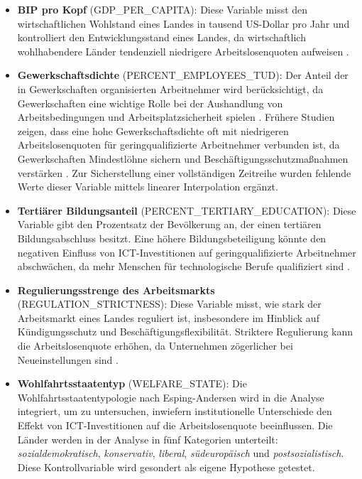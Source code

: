 \begin{itemize}
    \item \textbf{\ac{BIP} pro Kopf} (GDP\_PER\_CAPITA): Diese Variable misst den wirtschaftlichen 
    Wohlstand eines Landes in tausend US-Dollar pro Jahr und kontrolliert den Entwicklungsstand 
    eines Landes, da wirtschaftlich wohlhabendere Länder tendenziell niedrigere Arbeitslosenquoten 
    aufweisen \parencite{oecd2022gdp}.

    \item \textbf{Gewerkschaftsdichte} (PERCENT\_EMPLOYEES\_TUD): Der Anteil der in Gewerkschaften 
    organisierten Arbeitnehmer wird berücksichtigt, da Gewerkschaften eine wichtige Rolle bei der 
    Aushandlung von Arbeitsbedingungen und Arbeitsplatzsicherheit spielen \parencite{oecd2022tud}. 
    Frühere Studien zeigen, dass eine hohe Gewerkschaftsdichte oft mit niedrigeren 
    Arbeitslosenquoten für geringqualifizierte Arbeitnehmer verbunden ist, da Gewerkschaften 
    Mindestlöhne sichern und Beschäftigungsschutzmaßnahmen verstärken 
    \parencite[S. 61]{nickell1997unemployment}. Zur Sicherstellung einer vollständigen Zeitreihe 
    wurden fehlende Werte dieser Variable mittels linearer Interpolation ergänzt.

    \item \textbf{Tertiärer Bildungsanteil} (PERCENT\_TERTIARY\_EDUCATION): Diese 
    Variable gibt den Prozentsatz der Bevölkerung an, der einen tertiären Bildungsabschluss 
    besitzt. Eine höhere Bildungsbeteiligung könnte den negativen Einfluss von 
    \ac{ICT}-Investitionen auf geringqualifizierte Arbeitnehmer abschwächen, da mehr Menschen für 
    technologische Berufe qualifiziert sind \parencite{oecd2022education}.

    \item \textbf{Regulierungsstrenge des Arbeitsmarkts} (REGULATION\_STRICTNESS): Diese Variable 
    misst, wie stark der Arbeitsmarkt eines Landes reguliert ist, insbesondere im Hinblick auf 
    Kündigungsschutz und Beschäftigungsflexibilität. Striktere Regulierung kann die 
    Arbeitslosenquote erhöhen, da Unternehmen zögerlicher bei Neueinstellungen sind 
    \parencite{oecd2022regulation}.

    \item \textbf{Wohlfahrtsstaatentyp} (WELFARE\_STATE): Die Wohlfahrtsstaatentypologie nach 
    Esping-Andersen \parencite{espingandersen1990thethree} wird in die Analyse integriert, 
    um zu untersuchen, inwiefern institutionelle Unterschiede den Effekt von \ac{ICT}-Investitionen 
    auf die Arbeitslosenquote beeinflussen. Die Länder werden in der Analyse in fünf Kategorien 
    unterteilt: \textit{sozialdemokratisch}, \textit{konservativ}, \textit{liberal}, 
    \textit{südeuropäisch} und \textit{postsozialistisch}. Diese Kontrollvariable wird gesondert 
    als eigene Hypothese getestet.

\end{itemize}

